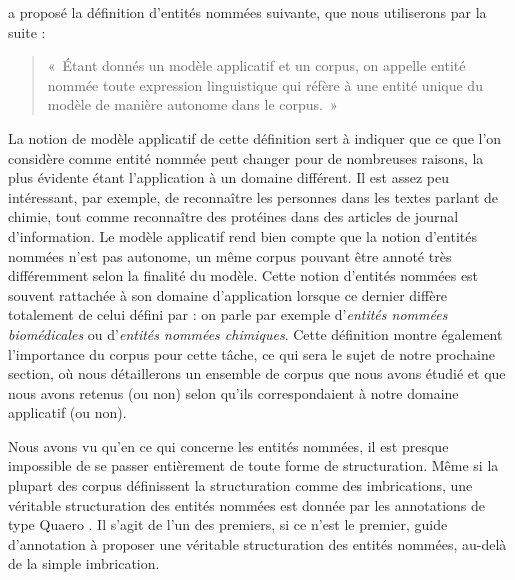 \documentclass[PhD-Yoann-Dupont.tex]{subfiles}
\begin{document}
\citet{ehrmann2008entites} a proposé la définition d'entités nommées suivante, que nous utiliserons par la suite : \begin{quote}«\ Étant donnés un modèle applicatif et un corpus, on appelle entité nommée toute expression linguistique qui réfère à une entité unique du modèle de manière autonome dans le corpus.\ »\end{quote}

La notion de modèle applicatif de cette définition sert à indiquer que ce que l'on considère comme entité nommée peut changer pour de nombreuses raisons, la plus évidente étant l'application à un domaine différent. Il est assez peu intéressant, par exemple, de reconnaître les personnes dans les textes parlant de chimie, tout comme reconnaître des protéines dans des articles de journal d'information. Le modèle applicatif rend bien compte que la notion d'entités nommées n'est pas autonome, un même corpus pouvant être annoté très différemment selon la finalité du modèle. Cette notion d'entités nommées est souvent rattachée à son domaine d'application lorsque ce dernier diffère totalement de celui défini par \citet{grishman1996message} : on parle par exemple d'\emph{entités nommées biomédicales} ou d'\emph{entités nommées chimiques}. Cette définition montre également l'importance du corpus pour cette tâche, ce qui sera le sujet de notre prochaine section, où nous détaillerons un ensemble de corpus que nous avons étudié et que nous avons retenus (ou non) selon qu'ils correspondaient à notre domaine applicatif (ou non).

Nous avons vu qu'en ce qui concerne les entités nommées, il est presque impossible de se passer entièrement de toute forme de structuration. Même si la plupart des corpus définissent la structuration comme des imbrications, une véritable structuration des entités nommées est donnée par les annotations de type Quaero \citep{rosset2011entites}. Il s'agit de l'un des premiers, si ce n'est le premier, guide d'annotation à proposer une véritable structuration des entités nommées, au-delà de la simple imbrication.

\end{document}
